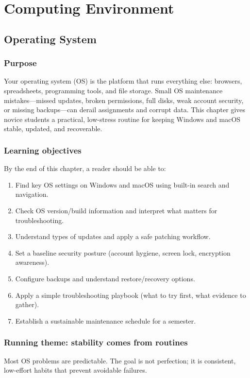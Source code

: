 \part{Computing Environment}
\chapter{Operating System}
\label{ch:os-management}

\section*{Purpose}
Your operating system (OS) is the platform that runs everything else: browsers, spreadsheets, programming tools, and file storage. Small OS maintenance mistakes—missed updates, broken permissions, full disks, weak account security, or missing backups—can derail assignments and corrupt data. This chapter gives novice students a practical, low-stress routine for keeping Windows and macOS stable, updated, and recoverable.

\section*{Learning objectives}
By the end of this chapter, a reader should be able to:
\begin{enumerate}
\item Find key OS settings on Windows and macOS using built-in search and navigation.
\item Check OS version/build information and interpret what matters for troubleshooting.
\item Understand types of updates and apply a safe patching workflow.
\item Set a baseline security posture (account hygiene, screen lock, encryption awareness).
\item Configure backups and understand restore/recovery options.
\item Apply a simple troubleshooting playbook (what to try first, what evidence to gather).
\item Establish a sustainable maintenance schedule for a semester.
\end{enumerate}

\section*{Running theme: stability comes from routines}
Most OS problems are predictable. The goal is not perfection; it is consistent, low-effort habits that prevent avoidable failures.

